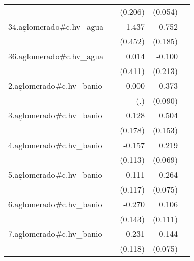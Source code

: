 {\begin{longtable}{l*{4}{D{.}{.}{-1}}}
            &                     &     (0.206)         &     (0.054)         &                     \\
\addlinespace
34.aglomerado#c.hv\_agua&                     &       1.437\sym{**} &       0.752\sym{***}&                     \\
            &                     &     (0.452)         &     (0.185)         &                     \\
\addlinespace
36.aglomerado#c.hv\_agua&                     &       0.014         &      -0.100         &                     \\
            &                     &     (0.411)         &     (0.213)         &                     \\
\addlinespace
2.aglomerado#c.hv\_banio&                     &       0.000         &       0.373\sym{***}&                     \\
            &                     &         (.)         &     (0.090)         &                     \\
\addlinespace
3.aglomerado#c.hv\_banio&                     &       0.128         &       0.504\sym{**} &                     \\
            &                     &     (0.178)         &     (0.153)         &                     \\
\addlinespace
4.aglomerado#c.hv\_banio&                     &      -0.157         &       0.219\sym{**} &                     \\
            &                     &     (0.113)         &     (0.069)         &                     \\
\addlinespace
5.aglomerado#c.hv\_banio&                     &      -0.111         &       0.264\sym{***}&                     \\
            &                     &     (0.117)         &     (0.075)         &                     \\
\addlinespace
6.aglomerado#c.hv\_banio&                     &      -0.270         &       0.106         &                     \\
            &                     &     (0.143)         &     (0.111)         &                     \\
\addlinespace
7.aglomerado#c.hv\_banio&                     &      -0.231\sym{*}  &       0.144         &                     \\
            &                     &     (0.118)         &     (0.075)         &                     \\

\end{longtable}}
